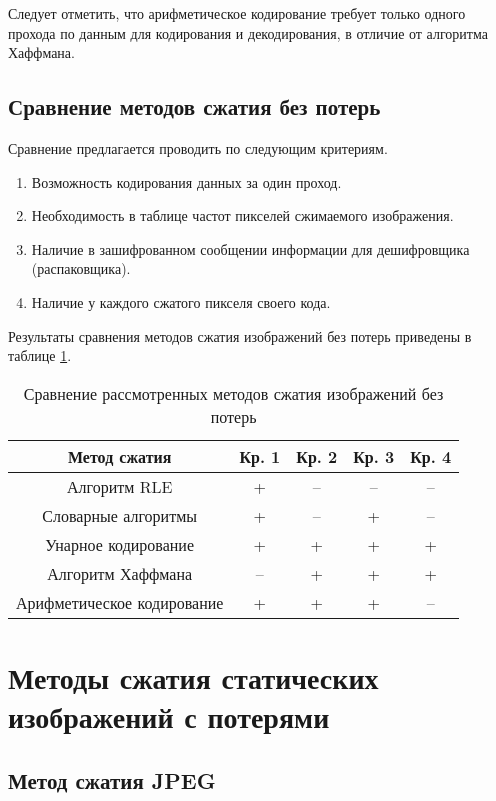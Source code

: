 Следует отметить, что арифметическое кодирование требует только одного прохода по данным для кодирования и декодирования, в отличие от алгоритма Хаффмана.

\subsection{Сравнение методов сжатия без потерь}

Сравнение предлагается проводить по следующим критериям.
\begin{enumerate}
    \item Возможность кодирования данных за один проход.
    \item Необходимость в таблице частот пикселей сжимаемого изображения.
    \item Наличие в зашифрованном сообщении информации для дешифровщика (распаковщика).
    \item Наличие у каждого сжатого пикселя своего кода.
\end{enumerate}

Результаты сравнения методов сжатия изображений без потерь приведены в таблице \ref{tbl:compare_realizations1}.
\begin{table}[H]
    \centering
	\caption{Сравнение рассмотренных методов сжатия изображений без потерь}
    \label{tbl:compare_realizations1}
	\begin{tabular}{|c|c|c|c|c|}
        \hline
        \textbf{Метод сжатия} & \textbf{Кр. 1} & \textbf{Кр. 2} & \textbf{Кр. 3} & \textbf{Кр. 4}
        \\ \hline
        Алгоритм RLE               & +  & -- & -- & -- \\ \hline
        Словарные алгоритмы        & +  & -- & +  & -- \\ \hline
        Унарное кодирование        & +  & +  & +  & +  \\ \hline
        Алгоритм Хаффмана          & -- & +  & +  & +  \\ \hline
        Арифметическое кодирование & +  & +  & +  & -- \\ \hline
    \end{tabular}
\end{table}

\section{Методы сжатия статических изображений с потерями}

\subsection{Метод сжатия JPEG}

